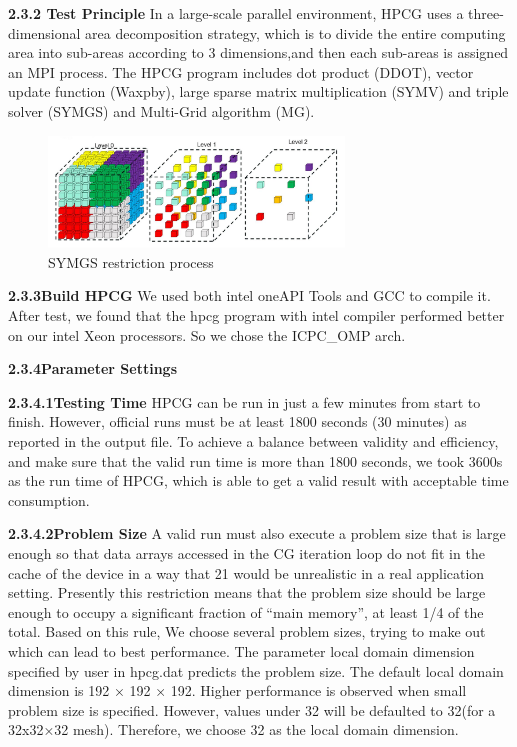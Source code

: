 \documentclass[a4paper,12pt]{article}
\begin{document}
\textbf{2.3.2 Test Principle}
In a large-scale parallel environment, HPCG uses a three-dimensional area decomposition strategy, which is to divide the entire computing area into sub-areas according to 3 dimensions,and then each sub-areas is assigned an MPI process. The HPCG program includes dot product (DDOT), vector update function (Waxpby), large sparse matrix multiplication (SYMV) and triple solver (SYMGS) and Multi-Grid algorithm (MG).

\begin{figure}[H]
    \centering
    \includegraphics[width=0.7\textwidth]{SYMGS_restriction_process.png}
    \caption{SYMGS restriction process}
    \label{fig:symgs_restriction}
\end{figure}

\textbf{2.3.3Build HPCG}
We used both intel oneAPI Tools and GCC to compile it. After test, we found that the hpcg program with intel compiler performed better on our intel Xeon processors. So we chose the ICPC\_OMP arch.

\textbf{2.3.4Parameter Settings}

\textbf{2.3.4.1Testing Time}
HPCG can be run in just a few minutes from start to finish. However, official runs must be at least 1800 seconds (30 minutes) as reported in the output file. To achieve a balance between validity and efficiency, and make sure that the valid run time is more than 1800 seconds, we took 3600s as the run time of HPCG, which is able to get a valid result with acceptable time consumption.

\textbf{2.3.4.2Problem Size}
A valid run must also execute a problem size that is large enough so that data arrays accessed in the CG iteration loop do not fit in the cache of the device in a way that 21 would be unrealistic in a real application setting. Presently this restriction means that the problem size should be large enough to occupy a significant fraction of “main memory”, at least 1/4 of the total. Based on this rule, We choose several problem sizes, trying to make out which can lead to best performance.
The parameter local domain dimension specified by user in hpcg.dat predicts the problem size. The default local domain dimension is 192 × 192 × 192. Higher performance is observed when small problem size is specified. However, values under 32 will be defaulted to 32(for a 32x32×32 mesh). Therefore, we choose 32 as the local domain dimension.
\end{document}
